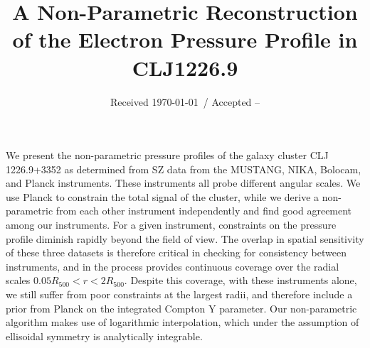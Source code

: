 \documentclass[twocolumn,traditabstract]{aa}
\begin{document}
\title{A Non-Parametric Reconstruction of the Electron Pressure Profile in CLJ1226.9}

\date{Received \today \ / Accepted --}



\abstract
    {We present the non-parametric pressure profiles of the galaxy cluster CLJ 1226.9+3352 as
      determined from SZ data from the MUSTANG, NIKA, Bolocam, and Planck instruments.
      These instruments all probe different angular scales. We use Planck to constrain the
      total signal of the cluster, while we derive a non-parametric from each  other instrument
      independently and find good agreement among our instruments. For a given instrument,
      constraints on the pressure profile diminish rapidly beyond the field of view.
      The overlap in spatial sensitivity of these three datasets is therefore critical in checking
      for consistency between instruments, and in the process provides continuous coverage over the radial scales
      $0.05 R_{500} < r < 2 R_{500}$. Despite this coverage, with these instruments alone, we
      still suffer from poor constraints at the largest radii, and therefore include a prior
      from Planck on the integrated Compton Y parameter. Our non-parametric algorithm makes
      use of logarithmic interpolation, which under the assumption of ellisoidal symmetry is
      analytically integrable.}

\end{document}
